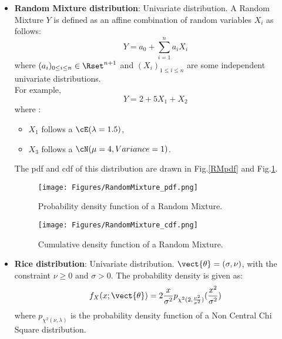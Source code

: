 {\begin{itemize}
\item {\bf Random Mixture distribution}: Univariate distribution. A Random Mixture $Y$ is defined as an affine combination of random variables $X_i$ as follows:
\begin{equation}
\displaystyle Y = a_0 + \sum_{i=1}^n a_i X_i
\end{equation}
where $(a_i)_{ 0 \leq i \leq n} \in \Rset^{n+1}$ and $(X_i)_{ 1 \leq i \leq n}$ are some independent univariate distributions.\\
For example,
\begin{equation}
Y = 2 + 5X_1 + X_2
\end{equation}
where :
\begin{itemize}
\item  $X_1$ follows a $\cE(\lambda = 1.5)$,
\item  $X_3$ follows a $\cN(\mu = 4,Variance = 1)$.
\end{itemize}
The pdf and cdf of this distribution are drawn in Fig.\ref{RMpdf} and Fig.\ref{RMcdf}.


\begin{figure}[H]
\begin{minipage}{8cm}
\begin{center}
\texttt{[image: Figures/RandomMixture\_pdf.png]}
\caption{Probability density function of a Random Mixture.}
\label{RMpdf}
\end{center}
\end{minipage}
\hfill
\begin{minipage}{8cm}
\begin{center}
\texttt{[image: Figures/RandomMixture\_cdf.png]}
\caption{Cumulative density function of a Random Mixture.}
\label{RMcdf}
\end{center}
\end{minipage}
\end{figure}





\item {\bf Rice distribution}:   Univariate distribution. $\vect{\theta} = \left( \sigma, \nu \right)$, with the constraint  $\nu\geq0$ and $\sigma>0$. The probability density is given as:
\begin{equation}
f_X(x;\vect{\theta}) = \displaystyle 2\frac{x}{\sigma^2}p_{\chi^2(2,\frac{\nu^2}{\sigma^2})}(\frac{x^2}{\sigma^2})
\end{equation}
where $p_{\chi^2(\nu, \lambda)}$ is the probability density function of a Non Central Chi Square distribution.




\end{itemize}}
